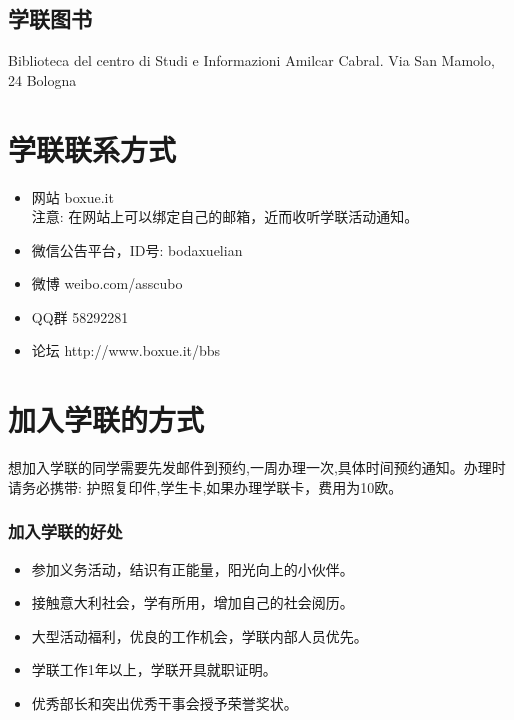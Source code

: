 \documentclass[3pt,a5paper,openright,twoside]{book}
\begin{document}
\subsection{学联图书}
Biblioteca del centro di Studi e Informazioni Amilcar Cabral. Via San Mamolo, 24 Bologna


\section{学联联系方式}
\begin{itemize}
\item 网站 boxue.it \\
注意: 在网站上可以绑定自己的邮箱，近而收听学联活动通知。
\item 微信公告平台，ID号: bodaxuelian
\item 微博 weibo.com/asscubo
\item QQ群 58292281
\item 论坛 http://www.boxue.it/bbs
\end{itemize}

\section{加入学联的方式}
想加入学联的同学需要先发邮件到预约,一周办理一次,具体时间预约通知。办理时请务必携带: 护照复印件,学生卡,如果办理学联卡，费用为10欧。

\subsubsection*{加入学联的好处}
\begin{itemize}
\item 参加义务活动，结识有正能量，阳光向上的小伙伴。
\item 接触意大利社会，学有所用，增加自己的社会阅历。
\item 大型活动福利，优良的工作机会，学联内部人员优先。
\item 学联工作1年以上，学联开具就职证明。
\item 优秀部长和突出优秀干事会授予荣誉奖状。
\end{itemize}


% 
%
%
%



\renewcommand{\chaptermark}[1]{\markright{\thechapter \ #1}{}}
\lhead[\fancyplain{}{\bfseries\thepage}]{\fancyplain{}{\bfseries\rightmark}}
\end{document}
